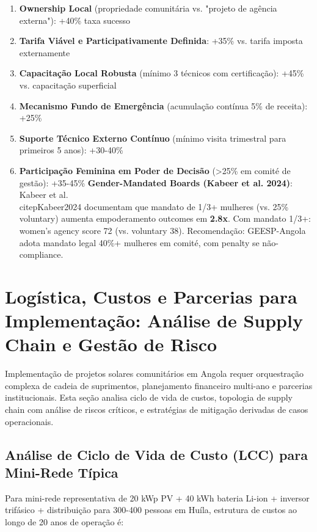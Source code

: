 \documentclass[12pt, a4paper]{article}
\begin{document}
\begin{enumerate}
\item\textbf{Ownership Local} (propriedade comunitária vs. "projeto de agência externa"): +40\% taxa sucesso
\item\textbf{Tarifa Viável e Participativamente Definida}: +35\% vs. tarifa imposta externamente
\item\textbf{Capacitação Local Robusta} (mínimo 3 técnicos com certificação): +45\% vs. capacitação superficial
\item\textbf{Mecanismo Fundo de Emergência} (acumulação contínua 5\% de receita): +25\%
\item\textbf{Suporte Técnico Externo Contínuo} (mínimo visita trimestral para primeiros 5 anos): +30-40\%
\item
\textbf{Participação Feminina em Poder de Decisão} (>25\% em comité de gestão): +35-45\%
\textbf{Gender-Mandated Boards (Kabeer et al. 2024)}: Kabeer et al.~\\citep{Kabeer2024} documentam que mandato de 1/3+ mulheres (vs. 25\% voluntary) aumenta empoderamento outcomes em
\textbf{2.8x}. Com mandato 1/3+: women's agency score 72 (vs. voluntary 38). Recomendação: GEESP-Angola adota mandato legal 40\%+ mulheres em comité, com penalty se não-compliance.
\end{enumerate}



\section{Logística, Custos e Parcerias para Implementação: Análise de Supply Chain e Gestão de Risco}

Implementação de projetos solares comunitários em Angola requer orquestração complexa de cadeia de suprimentos, planejamento financeiro multi-ano e parcerias institucionais. Esta seção analisa ciclo de vida de custos, topologia de supply chain com análise de riscos críticos, e estratégias de mitigação derivadas de casos operacionais.

\subsection{Análise de Ciclo de Vida de Custo (LCC) para Mini-Rede Típica}

Para mini-rede representativa de 20 kWp PV + 40 kWh bateria Li-ion + inversor trifásico + distribuição para 300-400 pessoas em Huíla, estrutura de custos ao longo de 20 anos de operação é:
\end{document}
